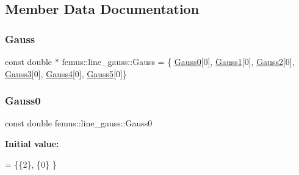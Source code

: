 \subsection{Member Data Documentation}
\mbox{\label{classfemus_1_1line__gauss_a98d1a256c5c9b680c188abb8f773d960}} 
\subsubsection{\texorpdfstring{Gauss}{Gauss}}
{\footnotesize\ttfamily const double $\ast$ femus\+::line\+\_\+gauss\+::\+Gauss = \{ \mbox{\hyperlink{classfemus_1_1line__gauss_a1e8041f638f61169aaa53eb0785605bd}{Gauss0}}\mbox{[}0\mbox{]}, \mbox{\hyperlink{classfemus_1_1line__gauss_a608a247f6e281ba3cc33d5c7cf7c26a5}{Gauss1}}\mbox{[}0\mbox{]}, \mbox{\hyperlink{classfemus_1_1line__gauss_a06822a846f9c487eac127761930838b9}{Gauss2}}\mbox{[}0\mbox{]}, \mbox{\hyperlink{classfemus_1_1line__gauss_a3e4469455ddc119739471ab651b7dbff}{Gauss3}}\mbox{[}0\mbox{]}, \mbox{\hyperlink{classfemus_1_1line__gauss_ab2d03415a4eca319a16adfb8edb54074}{Gauss4}}\mbox{[}0\mbox{]}, \mbox{\hyperlink{classfemus_1_1line__gauss_a0f13fdd00e078abfb338deee2e1a1734}{Gauss5}}\mbox{[}0\mbox{]}\}\hspace{0.3cm}{\ttfamily [static]}}

\mbox{\label{classfemus_1_1line__gauss_a1e8041f638f61169aaa53eb0785605bd}} 
\subsubsection{\texorpdfstring{Gauss0}{Gauss0}}
{\footnotesize\ttfamily const double femus\+::line\+\_\+gauss\+::\+Gauss0\hspace{0.3cm}{\ttfamily [static]}}

{\bfseries Initial value\+:}
\begin{DoxyCode}
= \{\{2\},
    \{0\}
  \}
\end{DoxyCode}
\mbox{\label{classfemus_1_1line__gauss_a608a247f6e281ba3cc33d5c7cf7c26a5}} 
